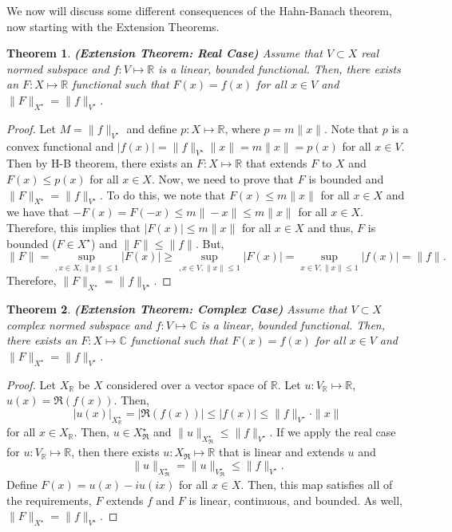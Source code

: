 \documentclass[oneside]{book}
\newtheorem{theorem}{Theorem}
\newcommand{\R}{{\mathbb R}}
\newcommand{\C}{{\mathbb C}}
\newcommand{\sbs}{\subset}
\newcommand{\Xs}{X^{\star}}
\newcommand{\Vs}{V^{\star}}
\begin{document}
\setcounter{cons}{0}
We now will discuss some different consequences of the Hahn-Banach theorem, now starting with the Extension Theorems.
\begin{theorem} \textbf{(Extension Theorem: Real Case)}
Assume that $V \sbs X$ real normed subspace and $f: V\mapsto \R$ is a linear, bounded functional. Then, there exists an $F: X \mapsto \R$ functional such that $F(x) = f(x)$ for all $x \in V$ and $\| F \|_{\Xs} = \| f \|_{V^{\star}}$.
\end{theorem}
\begin{proof}
Let $M = \| f \|_{V^{\star}}$ and define $p: X \mapsto \R$, where $p = m\| x \|$. Note that $p$ is a convex functional and $|f(x)| = \| f \|_{\Vs} \| x \| = m \| x \| = p(x)$ for all $x \in V$. Then by H-B theorem, there exists an $F: X \mapsto \R$ that extends $F$ to $X$ and $F(x) \leq p(x)$ for all $x \in X$. Now, we need to prove that $F$ is bounded and $\| F \|_{\Xs} = \| f \|_{\Vs}$. To do this, we note that $F(x) \leq m \| x \|$ for all $ x \in X$ and we have that $-F(x) = F(-x) \leq m \| -x \|\leq m \| x \|$ for all $x \in X$. Therefore, this implies that $|F(x)| \leq m \| x \|$ for all $x \in X$ and thus, $F$ is bounded ($F \in \Xs$) and $\| F \| \leq \|f \|$. But, 
\[ \| F \| = \sup\limits_{, x \in X, \| x \| \leq 1} |F(x)| \geq \sup\limits_{, x \in V, \| x \| \leq 1} |F(x)| = \sup\limits_{ x \in V, \| x \| \leq 1} |f(x)|  = \| f \|.\]
Therefore, $\| F \|_{\Xs} = \| f \|_{\Vs}$. 
\end{proof}
\begin{theorem} \textbf{(Extension Theorem: Complex Case)}
Assume that $V \sbs X$ complex normed subspace and $f: V\mapsto \C$ is a linear, bounded functional. Then, there exists an $F: X \mapsto \C$ functional such that $F(x) = f(x)$ for all $x \in V$ and $\| F \|_{\Xs} = \| f \|_{V^{\star}}$.
\end{theorem}
\begin{proof}
Let $X_{\R}$ be $X$ considered over a vector space of $\R$. Let $u: V_{\R} \mapsto \R$, $u(x) = \Re(f(x))$. Then, 
\[ |u(x)|_{X_{\R}^{\star}} = |\Re(f(x))| \leq |f(x)| \leq \| f \|_{\Vs} \cdot \| x \|\]
for all $x \in X_{\R}$. Then, $u \in X_{\Re}^{\star}$ and $\| u \|_{X_{\Re}^{\star}} \leq \| f \|_{\Vs}$. If we apply the real case for $u: V_{\R} \mapsto \R$, then there exists $u: X_{\Re} \mapsto \R$ that is linear and extends $u$ and 
\[ \| u \|_{X_{\Re}^{\star}} = \| u \|_{V_{\Re}^{\star}} \leq \| f \|_{\Vs}.\]
Define $F(x) = u(x) - i u(ix)$ for all $x \in X$. Then, this map satisfies all of the requirements, $F$ extends $f$ and $F$ is linear, continuous, and bounded. As well, $\| F \|_{\Xs} = \| f \|_{\Vs}$.
\end{proof}
\end{document}
